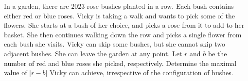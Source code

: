 In a garden, there are $2023$ rose bushes planted in a row.
Each bush contains either red or blue roses.
Vicky is taking a walk and wants to pick some of the flowers.
She starts at a bush of her choice, and picks a rose from it to add to her basket.
She then continues walking down the row and picks a single flower from each bush she visits.
Vicky can skip some bushes, but she cannot skip two adjacent bushes.
She can leave the garden at any point.
Let $r$ and $b$ be the number of red and blue roses she picked, respectively.
Determine the maximal value of $|r-b|$ Vicky can achieve, irrespective of the configuration of bushes. 
